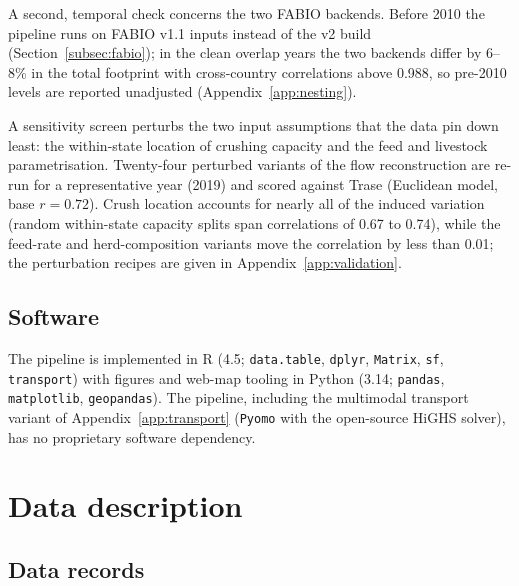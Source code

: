 \documentclass[pdflatex,sn-nature]{sn-jnl}%
\begin{document}
A second, temporal check concerns the two FABIO backends. Before 2010 the
pipeline runs on FABIO v1.1 inputs instead of the v2 build
(Section~\ref{subsec:fabio}); in the clean overlap years the two
backends differ by 6--8\% in the total footprint with cross-country
correlations above 0.988, so pre-2010 levels are reported unadjusted
(Appendix~\ref{app:nesting}).

\textcolor{green!50!black}{A sensitivity screen perturbs the two input
assumptions that the data pin down least: the within-state location of
crushing capacity and the feed and livestock parametrisation.
Twenty-four perturbed variants of the flow reconstruction are re-run
for a representative year (2019) and scored against Trase (Euclidean
model, base $r=0.72$). Crush location accounts for nearly all of the
induced variation (random within-state capacity splits span
correlations of 0.67 to 0.74), while the feed-rate and
herd-composition variants move the correlation by less than 0.01; the
perturbation recipes are given in Appendix~\ref{app:validation}.}

\subsection{Software}\label{subsec:software}
The pipeline is implemented in R (4.5; \texttt{data.table}, \texttt{dplyr},
\texttt{Matrix}, \texttt{sf}, \texttt{transport}) with figures and
web-map tooling in Python (3.14; \texttt{pandas}, \texttt{matplotlib},
\texttt{geopandas}). The pipeline, including the multimodal transport
variant of Appendix~\ref{app:transport} (\texttt{Pyomo} with the
open-source HiGHS solver), has no proprietary software dependency.

\section{Data description}\label{sec:datadesc}

\subsection{Data records}\label{subsec:datarecords}
\end{document}
